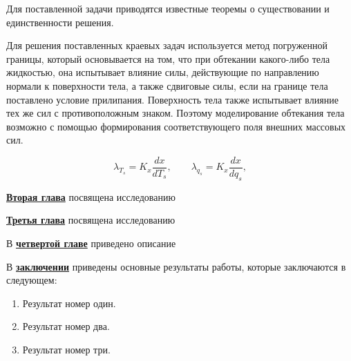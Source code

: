 Для поставленной задачи приводятся известные теоремы о существовании и единственности решения.

Для решения поставленных краевых задач используется метод погруженной границы, который основывается на том, что при 
обтекании какого-либо тела жидкостью, она испытывает влияние силы, действующие по направлению нормали к поверхности тела, а также 
сдвиговые силы, если на границе тела поставлено условие прилипания. Поверхность тела также испытывает влияние тех же сил с 
противоположным знаком. Поэтому моделирование обтекания тела возможно с помощью формирования соответствующего поля внешних 
массовых сил.

$$
  \lambda_{T_s} = K_x\frac{d{x}}{d{T_s}}, \qquad
  \lambda_{q_s} = K_x\frac{d{x}}{d{q_s}},
$$

\underline{\textbf{Вторая глава}} посвящена исследованию 

\underline{\textbf{Третья глава}} посвящена исследованию 

В \underline{\textbf{четвертой главе}} приведено описание 

В \underline{\textbf{заключении}} приведены основные результаты работы, которые заключаются в следующем:
\begin{enumerate}
 \item Результат номер один.
 \item Результат номер два.
 \item Результат номер три.
\end{enumerate}


\renewcommand{\refname}{\Large Публикации автора по теме диссертации}
\nocite{*}

